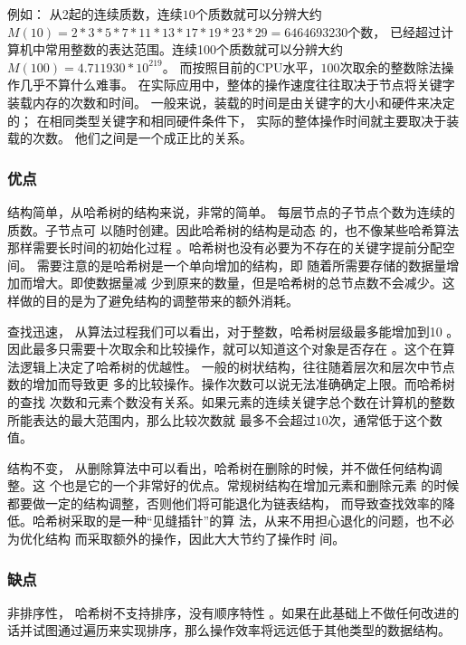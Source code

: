 例如：
从2起的连续质数，连续$ 10 $个质数就可以分辨大约$ M(10) =2*3*5*7*11*13*17*19*23*29= 6464693230  $个数，
已经超过计算机中常用整数的表达范围。连续100个质数就可以分辨大约$ M(100) = 4.711930 *10^{219} $。
而按照目前的CPU水平，$ 100 $次取余的整数除法操作几乎不算什么难事。
在实际应用中，整体的操作速度往往取决于节点将关键字装载内存的次数和时间。
一般来说，装载的时间是由关键字的大小和硬件来决定的；
在相同类型关键字和相同硬件条件下，
实际的整体操作时间就主要取决于装载的次数。
他们之间是一个成正比的关系。

\subsubsection{优点}
结构简单，从哈希树的结构来说，非常的简单。
每层节点的子节点个数为连续的质数。子节点可
以随时创建。因此哈希树的结构是动态
的，也不像某些哈希算法那样需要长时间的初始化过程
。哈希树也没有必要为不存在的关键字提前分配空间。
需要注意的是哈希树是一个单向增加的结构，即
随着所需要存储的数据量增加而增大。即使数据量减
少到原来的数量，但是哈希树的总节点数不会减少。这样做的目的是为了避免结构的调整带来的额外消耗。

查找迅速，
从算法过程我们可以看出，对于整数，哈希树层级最多能增加到1$ 0 $
。因此最多只需要十次取余和比较操作，就可以知道这个对象是否存在
。这个在算法逻辑上决定了哈希树的优越性。
一般的树状结构，往往随着层次和层次中节点数的增加而导致更
多的比较操作。操作次数可以说无法准确确定上限。而哈希树的查找
次数和元素个数没有关系。如果元素的连续关键字总个数在计算机的整数
所能表达的最大范围内，那么比较次数就
最多不会超过$ 10 $次，通常低于这个数值。 

结构不变，
从删除算法中可以看出，哈希树在删除的时候，并不做任何结构调整。这
个也是它的一个非常好的优点。常规树结构在增加元素和删除元素
的时候都要做一定的结构调整，否则他们将可能退化为链表结构，
而导致查找效率的降低。哈希树采取的是一种“见缝插针”的算
法，从来不用担心退化的问题，也不必为优化结构
而采取额外的操作，因此大大节约了操作时
间。

\subsubsection{缺点}
非排序性，
哈希树不支持排序，没有顺序特性
。如果在此基础上不做任何改进的话并试图通过遍历来实现排序，那么操作效率将远远低于其他类型的数据结构。

